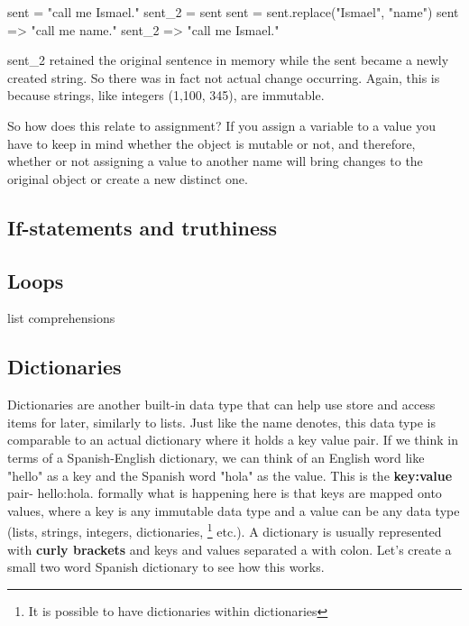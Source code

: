 \begin{python}
sent = "call me Ismael."
sent_2 = sent
sent = sent.replace("Ismael", "name")
sent
=> "call me name."
sent_2
=> "call me Ismael."
\end{python}

sent\_2 retained the original sentence in memory while the sent became a newly created string. So there was in fact not actual change occurring. Again, this is because strings, like integers (1,100, 345), are immutable. 


So how does this relate to assignment? If you assign a variable to a value you have to keep in mind whether the object is mutable or not, and therefore, whether or not assigning a value to another name will bring changes to the original object or create a new distinct one. 



\subsection{If-statements and truthiness}

\subsection{Loops}


list comprehensions

\subsection{Dictionaries}


Dictionaries are another built-in data type that can help use store and access items for later, similarly to lists. Just like the name denotes, this data type is comparable to an actual dictionary where it holds a key value pair. If we think in terms of a Spanish-English dictionary, we can think of an English word like "hello" as a key and the Spanish word "hola" as the value. This is the \textbf{key:value} pair- hello:hola. formally what is happening here is that keys are mapped onto values, where a key is any immutable data type and a value can be any data type (lists, strings, integers, dictionaries, \footnote{It is possible to have dictionaries within dictionaries} etc.). A dictionary is usually represented with \textbf{curly brackets} and keys and values separated a with colon. Let's create a small two word Spanish dictionary to see how this works. 

